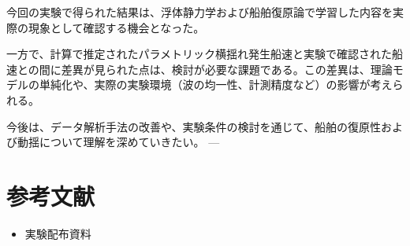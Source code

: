 \documentclass[dvipdfmx,a4paper]{jreport} %
\begin{document}
今回の実験で得られた結果は、浮体静力学および船舶復原論で学習した内容を実際の現象として確認する機会となった。

一方で、計算で推定されたパラメトリック横揺れ発生船速と実験で確認された船速との間に差異が見られた点は、検討が必要な課題である。この差異は、理論モデルの単純化や、実際の実験環境（波の均一性、計測精度など）の影響が考えられる。

今後は、データ解析手法の改善や、実験条件の検討を通じて、船舶の復原性および動揺について理解を深めていきたい。
---

\chapter{参考文献}
\begin{itemize}
    \item 実験配布資料
\end{itemize}
\end{document}
